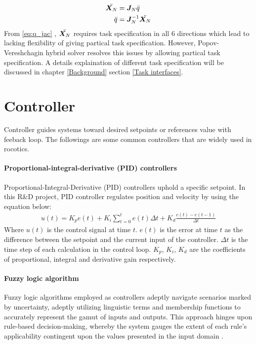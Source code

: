 \documentclass[report.tex]{subfiles}
\begin{document}
    \begin{align}
        \ddot{\bm{X_}N} &= \bm{J}_N \ddot{q}\\
        \label{eq:q_jac} \ddot{q} &= \bm{J}_N^{-1} \ddot{\bm{X_}N}
    \end{align}
    From \ref{eq:q_jac} , $\ddot{\bm{X_}N}$ requires task specification in all 6 directions which lead to lacking flexibility of giving partical task specification. However,  Popov-Vereshchagin hybrid solver resolves this issues by allowing partical task specification. A details explaination of different task specification will be discussed in chapter \ref{Background} section \ref{Task interfaces}.
    \section{Controller}
    \label{Controller}
    Controller guides systems toward desired setpoints or references value with feeback loop. The followings are some common controllers that are widely used in rocotics.
    \paragraph*{\large{Proportional-integral-derivative (PID) controllers}\\}
    Proportional-Integral-Derivative (PID) controllers uphold a specific setpoint. In this R\&D project, PID controller regulates position and velocity by using the equation below:
    \begin{align}
        u(t) = K_pe(t) + K_i\sum_{t=0}^{t} e(t) \Delta{t} + K_d \frac{e(t)-e(t-1)}{\Delta{t}}
    \end{align}
    Where $u(t)$ is the control signal at time $t$. $e(t)$ is the error at time $t$ as the difference between the setpoint and the current input of the controller. $\Delta{t}$ is the time step of each calculation in the control loop. $K_p$, $K_i$, $K_d$ are the coefficients of proportional, integral and derivative gain respectively\cite{johnson2005pid}.

    \paragraph*{\large{Fuzzy logic algorithm}\\}
    Fuzzy logic algorithms employed as controllers adeptly navigate scenarios marked by uncertainty, adeptly utilizing linguistic terms and membership functions to accurately represent the gamut of inputs and outputs. This approach hinges upon rule-based decision-making, whereby the system gauges the extent of each rule's applicability contingent upon the values presented in the input domain \cite{dadios2012fuzzy}.
\end{document}
